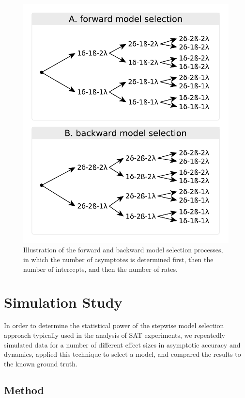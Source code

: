 \documentclass[10pt,letterpaper]{article}
\begin{document}
\begin{figure}[t]
\centering
\includegraphics{../figures/illustrations/decision_algo.pdf} %
\caption{\label{fig:model_selection}Illustration of the forward and backward model selection processes, in which the number of asymptotes is determined first, then the number of intercepts, and then the number of rates.}
\end{figure}

\section{Simulation Study}\label{our-simulations}

In order to determine the statistical power of the stepwise model selection approach typically used in the analysis of SAT experiments, we repeatedly simulated data for a number of different effect sizes in asymptotic accuracy and dynamics, applied this technique to select a model, and compared the results to the known ground truth.

\subsection{Method}\label{method}
\end{document}
